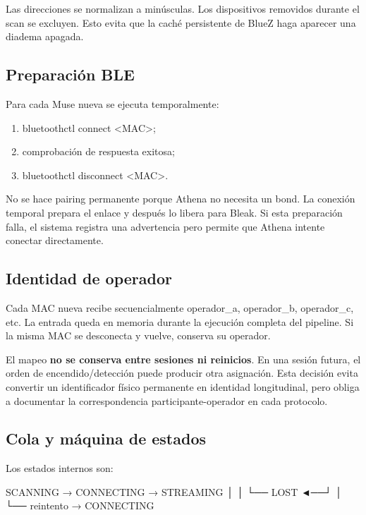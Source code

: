 \documentclass[11pt,a4paper]{article}
\begin{document}
Las direcciones se normalizan a minúsculas. Los dispositivos removidos durante el scan se excluyen. Esto evita que la caché persistente de BlueZ haga aparecer una diadema apagada.

\subsection{Preparación BLE}

Para cada Muse nueva se ejecuta temporalmente:

\begin{enumerate}
\item {\ttfamily\small bluetoothctl connect <MAC>};
\item comprobación de respuesta exitosa;
\item {\ttfamily\small bluetoothctl disconnect <MAC>}.
\end{enumerate}

No se hace pairing permanente porque Athena no necesita un bond. La conexión temporal prepara el enlace y después lo libera para Bleak. Si esta preparación falla, el sistema registra una advertencia pero permite que Athena intente conectar directamente.

\subsection{Identidad de operador}

Cada MAC nueva recibe secuencialmente {\ttfamily\small operador\_a}, {\ttfamily\small operador\_b}, {\ttfamily\small operador\_c}, etc. La entrada queda en memoria durante la ejecución completa del pipeline. Si la misma MAC se desconecta y vuelve, conserva su operador.

El mapeo \textbf{no se conserva entre sesiones ni reinicios}. En una sesión futura, el orden de encendido/detección puede producir otra asignación. Esta decisión evita convertir un identificador físico permanente en identidad longitudinal, pero obliga a documentar la correspondencia participante-operador en cada protocolo.

\subsection{Cola y máquina de estados}

Los estados internos son:

\begin{MuseCode}
SCANNING → CONNECTING → STREAMING
                 │           │
                 └── LOST ◄──┘
                       │
                       └── reintento → CONNECTING
\end{MuseCode}
\end{document}
